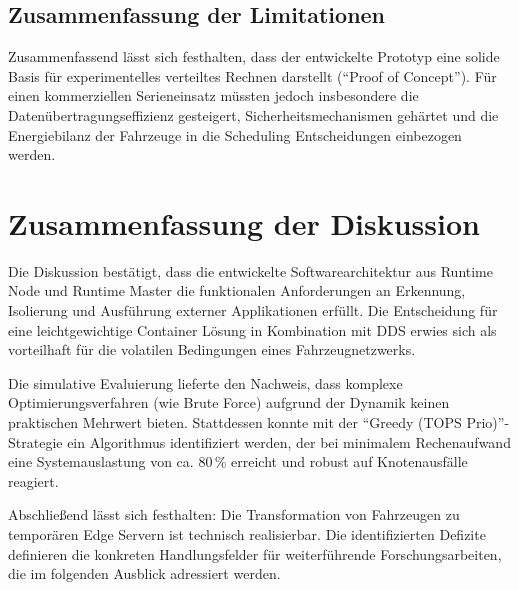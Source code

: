 \subsection{Zusammenfassung der Limitationen}
Zusammenfassend lässt sich festhalten, dass der entwickelte Prototyp eine solide Basis für experimentelles verteiltes Rechnen darstellt (\enquote{Proof of Concept}). Für einen kommerziellen Serieneinsatz müssten jedoch insbesondere die Datenübertragungseffizienz gesteigert, Sicherheitsmechanismen gehärtet und die Energiebilanz der Fahrzeuge in die Scheduling Entscheidungen einbezogen werden.

\section{Zusammenfassung der Diskussion}
Die Diskussion bestätigt, dass die entwickelte Softwarearchitektur aus Runtime Node und Runtime Master die funktionalen Anforderungen an Erkennung, Isolierung und Ausführung externer Applikationen erfüllt. Die Entscheidung für eine leichtgewichtige Container Lösung in Kombination mit \gls{DDS} erwies sich als vorteilhaft für die volatilen Bedingungen eines Fahrzeugnetzwerks.

Die simulative Evaluierung lieferte den Nachweis, dass komplexe Optimierungsverfahren (wie Brute Force) aufgrund der Dynamik keinen praktischen Mehrwert bieten. Stattdessen konnte mit der \enquote{Greedy (TOPS Prio)}-Strategie ein Algorithmus identifiziert werden, der bei minimalem Rechenaufwand eine Systemauslastung von ca. 80\,\% erreicht und robust auf Knotenausfälle reagiert.

Abschließend lässt sich festhalten: Die Transformation von Fahrzeugen zu temporären Edge Servern ist technisch realisierbar. Die identifizierten Defizite definieren die konkreten Handlungsfelder für weiterführende Forschungsarbeiten, die im folgenden Ausblick adressiert werden.